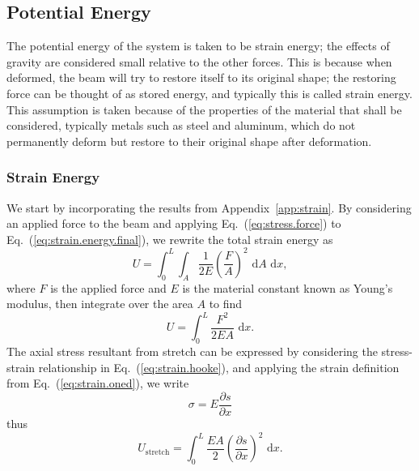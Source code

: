 \subsection{Potential Energy}

The potential energy of the system is taken to be strain energy; the effects of gravity are considered small relative to the other forces. This is because when deformed, the beam will try to restore itself to its original shape; the restoring force can be thought of as stored energy, and typically this is called strain energy. This assumption is taken because of the properties of the material that shall be considered, typically metals such as steel and aluminum, which do not permanently deform but restore to their original shape after deformation.

\subsubsection{Strain Energy}
We start by incorporating the results from Appendix~\ref{app:strain}. By considering an applied force to the beam and applying Eq.~(\ref{eq:stress.force}) to Eq.~(\ref{eq:strain.energy.final}), we rewrite the total strain energy as
\begin{equation}
U = \int_0^L\int_A\frac{1}{2E}\left(\frac{F}{A}\right)^2\text{ d}A\text{ d}x,
\end{equation}
where $F$ is the applied force and $E$ is the material constant known as Young's modulus, then integrate over the area $A$ to find
\begin{equation}
U = \int_0^L\frac{F^2}{2EA}\text{ d}x.
\end{equation}
The axial stress resultant from stretch can be expressed by considering the stress-strain relationship in Eq.~(\ref{eq:strain.hooke}), and applying the strain definition from Eq.~(\ref{eq:strain.oned}), we write
\begin{equation}
\sigma = E\frac{\partial s}{\partial x}
\end{equation} 
thus
\begin{equation}
U_{\text{stretch}} = \int_0^L\frac{EA}{2}\left(\frac{\partial s}{\partial x}\right)^2\text{ d}x.
\end{equation}

